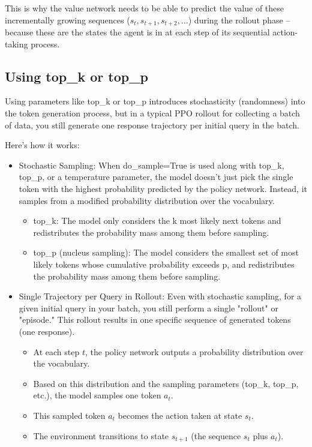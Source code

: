 \documentclass[10pt,a4paper]{report}
\begin{document}
This is why the value network needs to be able to predict the value of these incrementally growing sequences ($s_t, s_{t+1}, s_{t+2}, \dots$) during the rollout phase – because these are the states the agent is in at each step of its sequential action-taking process.

\subsection{Using top\_k or top\_p}
Using parameters like top\_k or top\_p introduces stochasticity (randomness) into the token generation process, but in a typical PPO rollout for collecting a batch of data, you still generate one response trajectory per initial query in the batch.

Here's how it works:
\begin{itemize}
\item    Stochastic Sampling: When do\_sample=True is used along with top\_k, top\_p, or a temperature parameter, the model doesn't just pick the single token with the highest probability predicted by the policy network. Instead, it samples from a modified probability distribution over the vocabulary.
		\begin{itemize}
        \item top\_k: The model only considers the k most likely next tokens and redistributes the probability mass among them before sampling.
       \item top\_p (nucleus sampling): The model considers the smallest set of most likely tokens whose cumulative probability exceeds p, and redistributes the probability mass among them before sampling.
		\end{itemize}
\item    Single Trajectory per Query in Rollout: Even with stochastic sampling, for a given initial query in your batch, you still perform a single "rollout" or "episode." This rollout results in one specific sequence of generated tokens (one response).
		\begin{itemize}
        \item At each step $t$, the policy network outputs a probability distribution over the vocabulary.
        \item Based on this distribution and the sampling parameters (top\_k, top\_p, etc.), the model samples one token $a_t$.
        \item This sampled token $a_t$ becomes the action taken at state $s_t$.
        \item The environment transitions to state $s_{t+1}$ (the sequence $s_t$ plus $a_t$).

\end{itemize}
\end{itemize}
\end{document}
